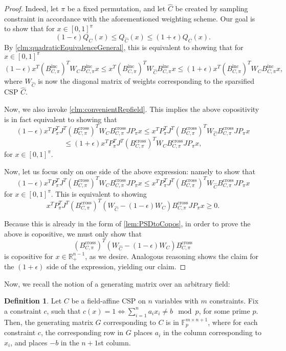 \documentclass[11pt]{article}
\theoremstyle{definition}
\newtheorem{definition}{Definition}[section]
\newcommand{\F}{\mathbb{F}}
\newcommand{\R}{\mathbb{R}}
\newcommand{\eps}{\epsilon}
\begin{document}
\begin{proof}
Indeed, let $\pi$ be a fixed permutation, and let $\hat{C}$ be created by sampling constraint in accordance with the aforementioned weighting scheme. Our goal is to show that for $x \in [0,1]^{\pi}$
\[
(1 - \eps)Q_C(x) \leq Q_{\hat{C}}(x) \leq (1 + \eps)Q_C(x).
\]
By \cref{clm:quadraticEquivalenceGeneral}, this is equivalent to showing that for $x \in [0,1]^{\pi}$
\[
(1 - \eps) x^T (B^{\text{inc}}_{C, \pi})^T W_C B^{\text{inc}}_{C, \pi} x  \leq x^T (B^{\text{inc}}_{C, \pi})^T W_{\hat{C}} B^{\text{inc}}_{C, \pi} x \leq (1 + \eps) x^T (B^{\text{inc}}_{C, \pi})^T W_C B^{\text{inc}}_{C, \pi} x,
\]
where $W_{\hat{C}} $ is now the diagonal matrix of weights corresponding to the sparsified CSP $\hat{C}$.

Now, we also invoke \cref{clm:convenientRepfield}. This implies the above copositivity is in fact equivalent to showing that 
\[
(1 - \eps) x^T P_{\pi}^{T} J^T (B^{\text{cross}}_{C, \pi})^T W_C B^{\text{cross}}_{C, \pi} J P_{\pi} x  \leq x^T P_{\pi}^{T} J^T (B^{\text{cross}}_{C, \pi})^T W_{\hat{C}} B^{\text{cross}}_{C, \pi} J P_{\pi} x 
\]
\[
\leq (1 + \eps) x^T P_{\pi}^{T} J^T (B^{\text{cross}}_{C, \pi})^T W_C B^{\text{cross}}_{C, \pi} J P_{\pi} x,
\]
for $x \in [0,1]^{\pi}$.

Now, let us focus only on one side of the above expression: namely to show that \[
(1 - \eps) x^T P_{\pi}^{T} J^T (B^{\text{cross}}_{C, \pi})^T W_C B^{\text{cross}}_{C, \pi} J P_{\pi} x  \leq x^T P_{\pi}^{T} J^T (B^{\text{cross}}_{C, \pi})^T W_{\hat{C}} B^{\text{cross}}_{C, \pi} J P_{\pi} x
\]for $x \in [0,1]^{\pi}$. This is equivalent to showing 
\[
x^T P_{\pi}^{T} J^T (B^{\text{cross}}_{C, \pi})^T (W_{\hat{C}} - (1 - \eps)W_C) B^{\text{cross}}_{C, \pi} J P_{\pi} x \geq 0.
\]

Because this is already in the form of \cref{lem:PSDtoCopos}, in order to prove the above is copositive, we must only show that 
\[
(B^{\text{cross}}_{C, \pi})^T (W_{\hat{C}} - (1 - \eps)W_C) B^{\text{cross}}_{C, \pi}
\]
is copositive for $x \in \R^{n-1}_+$, as we desire. Analogous reasoning shows the claim for the $(1 + \eps)$ side of the expression, yielding our claim. 
\end{proof}

Now, we recall the notion of a generating matrix over an arbitrary field:

\begin{definition}\label{def:genMatrixfield}
    Let $C$ be a field-affine CSP on $n$ variables with $m$ constraints. Fix a constraint $c$, such that $c(x) =1 \iff \sum_{i = 1}^n a_i x_i \neq b \mod p$, for some prime $p$. Then, the generating matrix $G$ corresponding to $C$ is in $\F_p^{m \times {n+1}}$, where for each constraint $c$, the corresponding row in $G$ places $a_i$ in the column corresponding to $x_i$, and places $-b$ in the $n+1$st column.
\end{definition}
\end{document}
